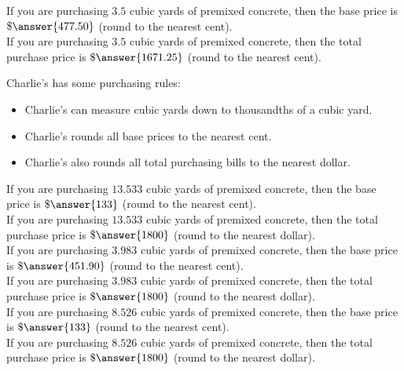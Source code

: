 \documentclass{ximera}
\begin{document}
\begin{exercise}

If you are purchasing $3.5$ cubic yards of premixed concrete, then the base price is $\$\answer{477.50}$ (round to the nearest cent). \\

If you are purchasing $3.5$ cubic yards of premixed concrete, then the total purchase price is $\$\answer{1671.25}$ (round to the nearest cent). \\

\end{exercise}






Charlie's has some purchasing rules:
\begin{itemize}
\item Charlie's can measure cubic yards down to thousandths of a cubic yard. 
\item Charlie's rounds all base prices to the nearest cent.
\item Charlie's also rounds all total purchasing bills to the nearest dollar.
\end{itemize}






\begin{exercise}

If you are purchasing $13.533$ cubic yards of premixed concrete, then the base price is $\$\answer{133}$ (round to the nearest cent). \\

If you are purchasing $13.533$ cubic yards of premixed concrete, then the total purchase price is $\$\answer{1800}$ (round to the nearest dollar). \\



If you are purchasing $3.983$ cubic yards of premixed concrete, then the base price is $\$\answer{451.90}$ (round to the nearest cent). \\

If you are purchasing $3.983$ cubic yards of premixed concrete, then the total purchase price is $\$\answer{1800}$ (round to the nearest dollar). \\



If you are purchasing $8.526$ cubic yards of premixed concrete, then the base price is $\$\answer{133}$ (round to the nearest cent). \\

If you are purchasing $8.526$ cubic yards of premixed concrete, then the total purchase price is $\$\answer{1800}$ (round to the nearest dollar). \\




\end{exercise}
\end{document}
